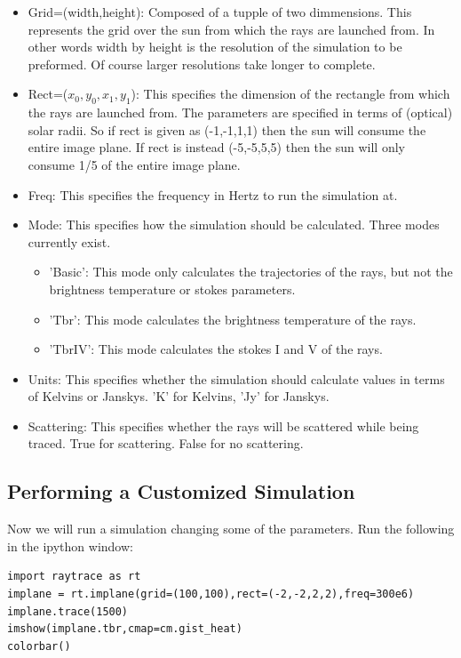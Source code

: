 \documentclass[12pt]{article}
\begin{document}
\begin{itemize}
\item Grid=(width,height): Composed of a tupple of two
  dimmensions. This represents the grid over the sun from which the
  rays are launched from. In other words width by height is the
  resolution of the simulation to be preformed. Of course larger 
  resolutions take longer to complete.

\item Rect=($x_0,y_0,x_1,y_1$): This specifies the dimension of the
  rectangle from which the rays are launched from. The parameters are
  specified in terms of (optical) solar radii. So if rect is given as 
  (-1,-1,1,1) then the sun will consume the entire image plane. If 
  rect is instead (-5,-5,5,5) then the sun will only consume 1/5 of 
  the entire image plane.
 
\item Freq: This specifies the frequency in Hertz to run the
  simulation at.

\item Mode: This specifies how the simulation should be
  calculated. Three modes currently exist.
  \begin{itemize}
    \item 'Basic': This mode only calculates the trajectories of the
      rays, but not the brightness temperature or stokes parameters.
    \item 'Tbr': This mode calculates the brightness temperature of
      the rays.
    \item 'TbrIV': This mode calculates the stokes I and V of the
      rays.
  \end{itemize}

\item Units: This specifies whether the simulation should calculate
  values in terms of Kelvins or Janskys. 'K' for Kelvins, 'Jy' for Janskys.

\item Scattering: This specifies whether the rays will be scattered
  while being traced. True for scattering. False for no scattering.

\end{itemize}

\subsection{Performing a Customized Simulation}
Now we will run a simulation changing some of the parameters. Run the
following in the ipython window:
\begin{lstlisting}
import raytrace as rt
implane = rt.implane(grid=(100,100),rect=(-2,-2,2,2),freq=300e6)
implane.trace(1500)
imshow(implane.tbr,cmap=cm.gist_heat)
colorbar()
\end{lstlisting}
\end{document}
